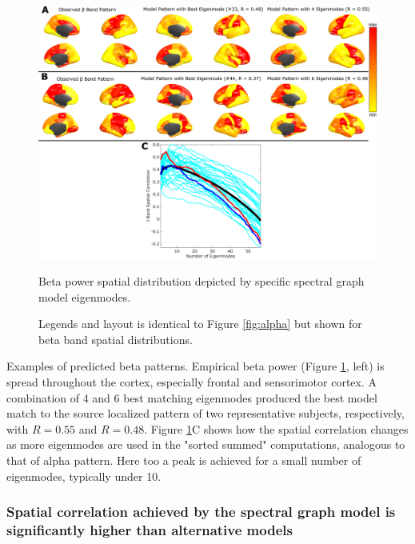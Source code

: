 \begin{figure}[htbp]
    \centering
    \includegraphics[width=\textwidth]{../figures/chapter5/fig6_beta.png}
    \caption{Beta power spatial distribution depicted by specific spectral graph model eigenmodes.}
    \caption*{Legends and layout is identical to Figure \ref{fig:alpha} but shown for beta band spatial distributions.}
    \label{fig:beta}
\end{figure}

Examples of predicted beta patterns. Empirical beta power
(Figure \ref{fig:beta}, left) is spread throughout the cortex, especially
frontal and sensorimotor cortex. A combination of 4 and 6 best matching
eigenmodes produced the best model match to the source localized pattern
of two representative subjects, respectively, with $R = 0.55$ and $R=0.48$.
Figure \ref{fig:beta}C shows how the spatial correlation changes as more
eigenmodes are used in the "sorted summed" computations, analogous to
that of alpha pattern. Here too a peak is achieved for a small number of
eigenmodes, typically under 10.

\subsubsection{Spatial correlation achieved by the spectral graph model is
significantly higher than alternative models}

